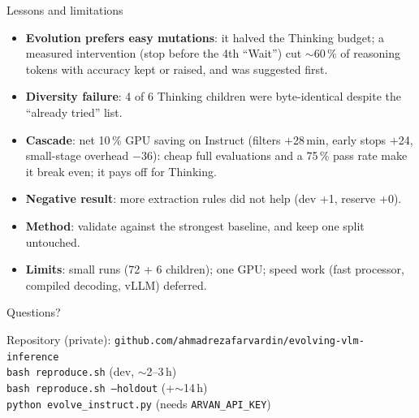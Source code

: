 \documentclass[aspectratio=169,10pt]{beamer}
\begin{document}
\begin{frame}{Lessons and limitations}
\begin{itemize}\small
  \item \textbf{Evolution prefers easy mutations}: it halved the Thinking budget; a measured intervention (stop before the
        4th ``Wait'') cut $\sim$60\,\% of reasoning tokens with accuracy kept or raised, and was suggested first.
  \item \textbf{Diversity failure}: 4 of 6 Thinking children were byte-identical despite the ``already tried'' list.
  \item \textbf{Cascade}: net 10\,\% GPU saving on Instruct (filters $+$28\,min, early stops $+$24, small-stage overhead
        $-$36): cheap full evaluations and a 75\,\% pass rate make it break even; it pays off for Thinking.
  \item \textbf{Negative result}: more extraction rules did not help (dev +1, reserve +0).
  \item \textbf{Method}: validate against the strongest baseline, and keep one split untouched.
  \item \textbf{Limits}: small runs (72 + 6 children); one GPU; speed work (fast processor, compiled decoding, vLLM)
        deferred.
\end{itemize}
\end{frame}

\begin{frame}[standout]
Questions?

\vspace{1em}
{\normalsize
Repository (private): \texttt{github.com/ahmadrezafarvardin/evolving-vlm-inference}\\[0.5em]
\texttt{bash reproduce.sh} \quad (dev, $\sim$2--3\,h)\\
\texttt{bash reproduce.sh --holdout} \quad (+$\sim$14\,h)\\
\texttt{python evolve\_instruct.py} \quad (needs \texttt{ARVAN\_API\_KEY})}
\end{frame}
\end{document}
